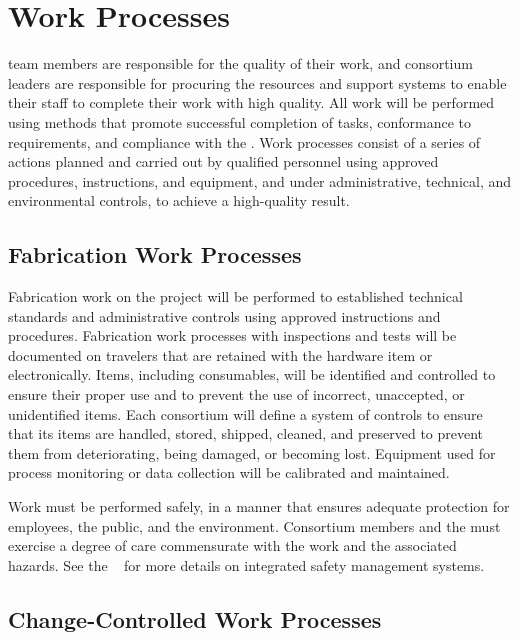 \section{Work Processes}

 team members are responsible for the quality of their
work, and consortium leaders are responsible for procuring the
resources and support systems to enable their staff to complete their
work with high quality. All  work will be performed using
methods that promote successful completion of tasks, conformance to
 requirements, and compliance with the
 . Work processes consist of a
series of actions planned and carried out by qualified personnel using
approved procedures, instructions, and equipment, and under administrative,
technical, and environmental controls, to achieve a high-quality
result.

\subsection{Fabrication Work Processes}

Fabrication work on the  project will be performed to
established technical standards and administrative controls using
approved instructions and procedures. Fabrication work processes with
 inspections and tests will be documented on travelers that
are retained with the hardware item or %
electronically. Items, including consumables, will be identified and
controlled to ensure their proper use and to  prevent the use of
incorrect, unaccepted, or unidentified items. Each consortium will define
a system of controls to ensure that its items are handled, stored,
shipped, cleaned, and preserved to prevent them from deteriorating,
being damaged, or becoming lost. Equipment used for process monitoring
or data collection will be calibrated and maintained. 

Work must be performed safely, in a manner that ensures adequate
protection for employees, the public, and the environment. Consortium
members and the   must exercise a degree of
care commensurate with the work and the associated hazards. See the
 ~\cite{bib:docdb291} for more details on
 integrated safety management systems. 

\subsection{Change-Controlled Work Processes}
\label{sec:change-control}

